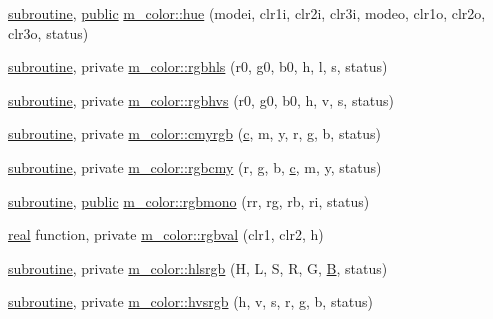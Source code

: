 \begin{DoxyCompactItemize}
\item 
\hyperlink{M__stopwatch_83_8txt_acfbcff50169d691ff02d4a123ed70482}{subroutine}, \hyperlink{M__stopwatch_83_8txt_a2f74811300c361e53b430611a7d1769f}{public} \hyperlink{namespacem__color_a56dd07bbf1378ccc78a230d171f9d429}{m\+\_\+color\+::hue} (modei, clr1i, clr2i, clr3i, modeo, clr1o, clr2o, clr3o, status)
\item 
\hyperlink{M__stopwatch_83_8txt_acfbcff50169d691ff02d4a123ed70482}{subroutine}, private \hyperlink{namespacem__color_a1dd027cbe65112af243d26195b1fc49a}{m\+\_\+color\+::rgbhls} (r0, g0, b0, h, l, s, status)
\item 
\hyperlink{M__stopwatch_83_8txt_acfbcff50169d691ff02d4a123ed70482}{subroutine}, private \hyperlink{namespacem__color_a76f00e1d418c4904a963094bc730a0e6}{m\+\_\+color\+::rgbhvs} (r0, g0, b0, h, v, s, status)
\item 
\hyperlink{M__stopwatch_83_8txt_acfbcff50169d691ff02d4a123ed70482}{subroutine}, private \hyperlink{namespacem__color_ab91687e87d0901874e52efe5933e3044}{m\+\_\+color\+::cmyrgb} (\hyperlink{c_8f90_aeb1f4e639be0213b4cbd07f2583a5b1f}{c}, m, y, r, g, b, status)
\item 
\hyperlink{M__stopwatch_83_8txt_acfbcff50169d691ff02d4a123ed70482}{subroutine}, private \hyperlink{namespacem__color_ad6e8505eef5add299c4475d289f3c5c5}{m\+\_\+color\+::rgbcmy} (r, g, b, \hyperlink{c_8f90_aeb1f4e639be0213b4cbd07f2583a5b1f}{c}, m, y, status)
\item 
\hyperlink{M__stopwatch_83_8txt_acfbcff50169d691ff02d4a123ed70482}{subroutine}, \hyperlink{M__stopwatch_83_8txt_a2f74811300c361e53b430611a7d1769f}{public} \hyperlink{namespacem__color_aca19999686fc20d79da580c6a643dc35}{m\+\_\+color\+::rgbmono} (rr, rg, rb, ri, status)
\item 
\hyperlink{read__watch_83_8txt_abdb62bde002f38ef75f810d3a905a823}{real} function, private \hyperlink{namespacem__color_a3e97e24dba7b820f685f13eaa64a6caa}{m\+\_\+color\+::rgbval} (clr1, clr2, h)
\item 
\hyperlink{M__stopwatch_83_8txt_acfbcff50169d691ff02d4a123ed70482}{subroutine}, private \hyperlink{namespacem__color_a40e6c91da216384eded2157cdaf86eba}{m\+\_\+color\+::hlsrgb} (H, L, S, R, G, \hyperlink{intro__blas1_83_8txt_a5f157716d3fd55e7b7e08312dc859b58}{B}, status)
\item 
\hyperlink{M__stopwatch_83_8txt_acfbcff50169d691ff02d4a123ed70482}{subroutine}, private \hyperlink{namespacem__color_a334ec90d94bbfb9a4c08c5f9efdb8c47}{m\+\_\+color\+::hvsrgb} (h, v, s, r, g, b, status)

\end{DoxyCompactItemize}
